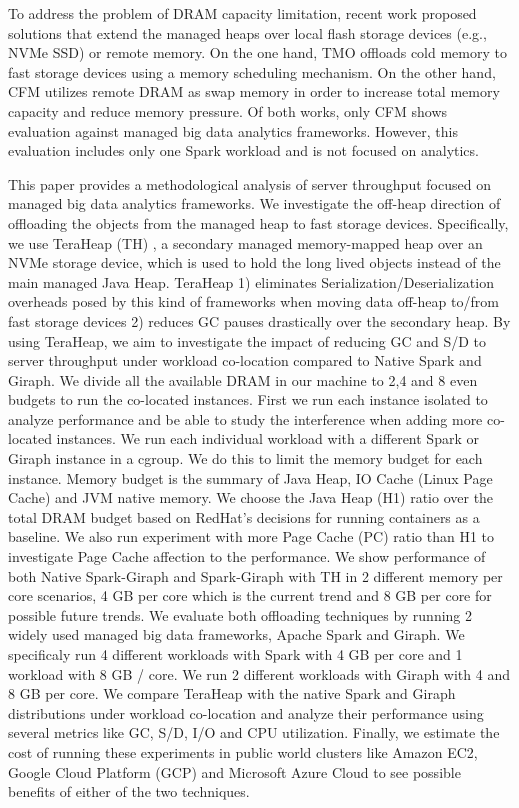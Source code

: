 To address the problem of DRAM capacity limitation, recent work
proposed solutions that extend the managed heaps over local flash
storage devices (e.g., NVMe SSD) or remote memory. On the one hand,
TMO \cite{TMO} offloads cold memory to fast storage devices using
a memory scheduling mechanism. On the other hand, CFM \cite{CFM}
utilizes remote DRAM as swap memory in order to increase total memory capacity
and reduce memory pressure. Of both works, only CFM shows
evaluation against managed big data analytics frameworks. However, this evaluation
includes only one Spark workload and is not focused on analytics.

This paper provides a methodological analysis of server throughput 
focused on managed big data analytics frameworks.
We investigate the off-heap direction of offloading the objects from the
managed heap to fast storage devices.
Specifically, we use TeraHeap (TH) \cite{TeraHeap}, a secondary managed
memory-mapped heap over an NVMe storage device, which is used to hold
the long lived objects instead of the main managed Java Heap. TeraHeap
1) eliminates Serialization/Deserialization overheads posed by this
kind of frameworks when moving data off-heap to/from fast storage
devices 2) reduces GC pauses drastically over the secondary heap. By
using TeraHeap, we aim to investigate the impact of reducing GC and S/D
to server throughput under workload co-location compared to Native Spark
and Giraph. We divide all the available DRAM
in our machine to 2,4 and 8 even budgets to run the co-located instances.
First we run each instance isolated to analyze performance and be able to study the interference when adding more
co-located instances. We run each individual workload with a different Spark or Giraph instance in a cgroup.
We do this to limit the memory budget for each instance. Memory budget is
the summary of Java Heap, IO Cache (Linux Page Cache) and JVM native memory. We choose
the Java Heap (H1) ratio over the total DRAM budget based on RedHat's decisions
for running containers as a baseline. We also run experiment with more Page Cache (PC) ratio than H1
to investigate Page Cache affection to the performance. We show performance of both Native Spark-Giraph and Spark-Giraph with TH in 2 different
memory per core scenarios, 4 GB per core which is the current trend and 8 GB per core 
for possible future trends. We evaluate both offloading techniques by running 2 widely used
managed big data frameworks, Apache Spark and Giraph. We
specificaly run 4 different workloads with Spark with 4 GB per core and 1 workload with 8 GB / core.
We run 2 different workloads with Giraph with 4 and 8 GB per core.
We compare TeraHeap with the native Spark and Giraph distributions under workload
co-location and analyze their performance using several metrics like
GC, S/D, I/O and CPU utilization. Finally, we estimate the cost of running these
experiments in public world clusters like Amazon EC2, Google Cloud Platform (GCP)
and Microsoft Azure Cloud to see possible benefits of either of the two techniques.

